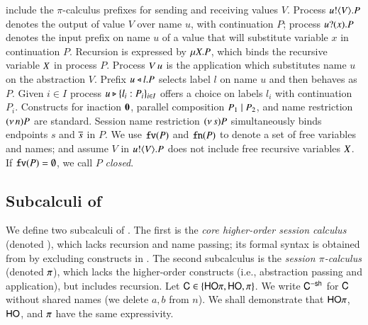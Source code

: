 include the
$\pi$-calculus prefixes for sending and receiving values $V$.
Process $u ! \langle V \rangle . P$ denotes the output of value $V$
over name $u$, with continuation $P$;
process $u ? (x) . P$ denotes the input prefix on name $u$ of a value
that 
will substitute variable $x$ in continuation $P$. 
Recursion is expressed by $\mu X. P$,
which binds the recursive variable $X$ in process $P$.
Process 
$V\, {u}$ 
is the application
which substitutes name $u$ on the abstraction $V$. 
Prefix $u \triangleleft l . P$ selects label $l$ on name $u$ and then behaves as $P$.
Given $i \in I$ process $u \triangleright \{l_i: P_i\}_{i \in I}$ offers a choice on labels $l_i$ with
continuation $P_i$.
Constructs for 
inaction $\mathbf{0}$,  parallel composition $P_1 \;|\; P_2$, and 
name restriction $(\nu\, n) P$ are standard.
Session name restriction $(\nu\, s) P$ simultaneously binds endpoints $s$ and $\overline{s}$ in $P$.
We use $\mathtt{fv}(P)$ and $\mathtt{fn}(P)$ to denote a set of free 
variables and names; 
and assume $V$ in $u ! \langle V \rangle .{P}$ does not include free recursive 
variables $X$. 
If $\mathtt{fv}(P) = \emptyset$, we call $P$ {\em closed}.

\subsection{Subcalculi of \HOp}
\label{subsec:subcalculi}
\noi
We define two subcalculi of \HOp. 
The first is the 
{\em core higher-order session calculus} (denoted \HO),
which lacks recursion and name passing; its 
formal syntax is obtained from  by excluding 
constructs in .
The second subcalculus is 
the {\em session $\pi$-calculus} 
(denoted $\pi$), which 
lacks  the
higher-order constructs
(i.e., abstraction passing and application), but includes recursion.
Let $\mathsf{C} \in \{\mathsf{HO}\pi, \mathsf{HO}, \pi\}$. We write 
$\mathsf{C}^{-\mathsf{sh}}$ for $\mathsf{C}$ without shared names
(we delete $a,b$ from $n$). 
We shall demonstrate that 
$\mathsf{HO}\pi$, $\mathsf{HO}$, and $\pi$ have the same expressivity.

